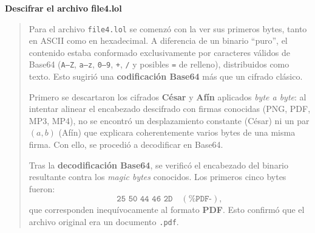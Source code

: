 \textbf{Descifrar el archivo file4.lol}
\begin{quote}
    Para el archivo \texttt{file4.lol} se comenzó con la ver sus primeros bytes,
    tanto en ASCII como en hexadecimal. A diferencia de un binario “puro”, el contenido
    estaba conformado exclusivamente por caracteres válidos de Base64 (\texttt{A–Z},
    \texttt{a–z}, \texttt{0–9}, \texttt{+}, \texttt{/} y posibles \texttt{=} de relleno), distribuidos
    como texto. Esto sugirió una \textbf{codificación Base64} más que un cifrado clásico.

    Primero se descartaron los cifrados \textbf{César} y \textbf{Afín} aplicados \emph{byte a byte}:
    al intentar alinear el encabezado descifrado con firmas conocidas (PNG, PDF, MP3, MP4),
    no se encontró un desplazamiento constante (César) ni un par $(a,b)$ (Afín) que explicara
    coherentemente varios bytes de una misma firma. Con ello, se procedió a decodificar
    en Base64.

    Tras la \textbf{decodificación Base64}, se verificó el encabezado del binario resultante contra
    los \emph{magic bytes} conocidos. Los primeros cinco bytes fueron:
    \[
      \texttt{25\ 50\ 44\ 46\ 2D} \quad (\texttt{\%PDF-}),
    \]
    que corresponden inequívocamente al formato \textbf{PDF}. Esto confirmó que el archivo
    original era un documento \texttt{.pdf}.

\end{quote}
\vspace{.5cm}